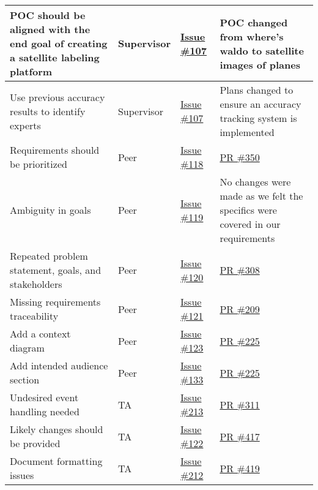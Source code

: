 \documentclass{article}
\begin{document}
\begin{longtable}{|p{5cm}|p{1.5cm}|p{2cm}|p{5cm}|}
%
POC should be aligned with the end goal of creating a satellite labeling platform & Supervisor & \href{https://github.com/OKKM-insights/OKKM.insights/issues/107}{Issue \#107} & POC changed from where's waldo to satellite images of planes \\ \hline
Use previous accuracy results to identify experts & Supervisor & \href{https://github.com/OKKM-insights/OKKM.insights/issues/107}{Issue \#107} & Plans changed to ensure an accuracy tracking system is implemented \\ \hline
Requirements should be prioritized & Peer & \href{https://github.com/OKKM-insights/OKKM.insights/issues/118}{Issue \#118} & \href{https://github.com/OKKM-insights/OKKM.insights/pull/350}{PR \#350} \\ \hline
Ambiguity in goals & Peer & \href{https://github.com/OKKM-insights/OKKM.insights/issues/119}{Issue \#119} & No changes were made as we felt the specifics were covered in our requirements \\ \hline
Repeated problem statement, goals, and stakeholders & Peer & \href{https://github.com/OKKM-insights/OKKM.insights/issues/120}{Issue \#120} & \href{https://github.com/OKKM-insights/OKKM.insights/pull/308}{PR \#308} \\ \hline
Missing requirements traceability & Peer & \href{https://github.com/OKKM-insights/OKKM.insights/issues/121}{Issue \#121} & \href{https://github.com/OKKM-insights/OKKM.insights/pull/209}{PR \#209} \\ \hline
Add a context diagram & Peer & \href{https://github.com/OKKM-insights/OKKM.insights/issues/123}{Issue \#123} & \href{https://github.com/OKKM-insights/OKKM.insights/pull/225}{PR \#225} \\ \hline
Add intended audience section & Peer & \href{https://github.com/OKKM-insights/OKKM.insights/issues/133}{Issue \#133} & \href{https://github.com/OKKM-insights/OKKM.insights/pull/225}{PR \#225} \\ \hline
Undesired event handling needed & TA & \href{https://github.com/OKKM-insights/OKKM.insights/issues/213}{Issue \#213} & \href{https://github.com/OKKM-insights/OKKM.insights/pull/311}{PR \#311} \\ \hline
Likely changes should be provided & TA & \href{https://github.com/OKKM-insights/OKKM.insights/issues/122}{Issue \#122} & \href{https://github.com/OKKM-insights/OKKM.insights/pull/417}{PR \#417} \\ \hline
Document formatting issues & TA & \href{https://github.com/OKKM-insights/OKKM.insights/issues/212}{Issue \#212} & \href{https://github.com/OKKM-insights/OKKM.insights/pull/419}{PR \#419} \\ \hline

\end{longtable}
\end{document}
